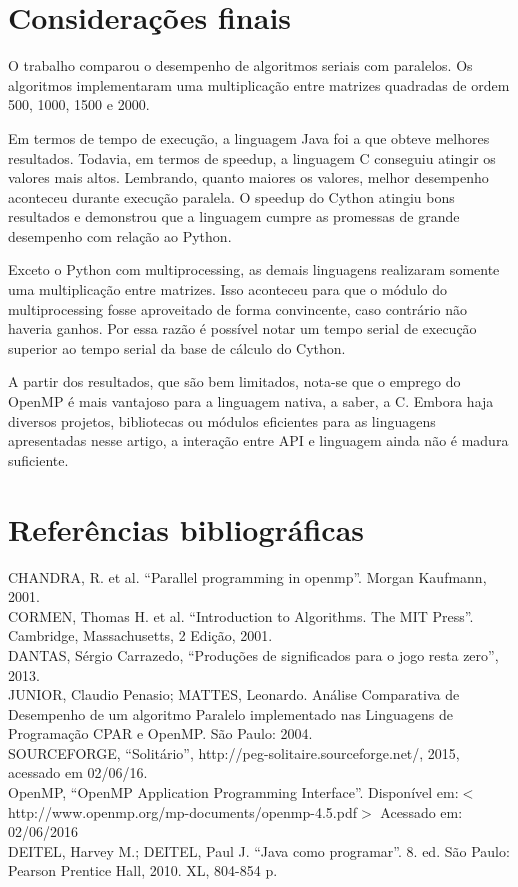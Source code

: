 \documentclass[a4paper,12pt]{article}
\begin{document}
\section{Considerações finais}
O trabalho comparou o desempenho de algoritmos seriais com paralelos. Os algoritmos implementaram uma multiplicação entre matrizes quadradas de ordem 500, 1000, 1500 e 2000. 

Em termos de tempo de execução, a linguagem Java foi a que obteve melhores resultados. Todavia, em termos de speedup, a linguagem C conseguiu atingir os valores mais altos. Lembrando, quanto maiores os valores, melhor desempenho aconteceu durante execução paralela. O speedup do Cython atingiu bons resultados e demonstrou que a linguagem cumpre as promessas de grande desempenho com relação ao Python. 

Exceto o Python com multiprocessing, as demais linguagens realizaram somente uma multiplicação entre matrizes. Isso aconteceu para que o módulo do multiprocessing fosse aproveitado de forma convincente, caso contrário não haveria ganhos. Por essa razão é possível notar um tempo serial de execução superior ao tempo serial da base de cálculo do Cython.

A partir dos resultados, que são bem limitados, nota-se que o emprego do OpenMP é mais vantajoso para a linguagem nativa, a saber, a C. Embora haja diversos projetos, bibliotecas ou módulos eficientes para as linguagens apresentadas nesse artigo, a interação entre API e linguagem ainda não é madura suficiente.  

\section{Referências bibliográficas}
\noindent
\cite{1} CHANDRA, R. et al. “Parallel programming in openmp”. Morgan Kaufmann, 2001.\\
\hspace{0.5cm}
\cite{2} CORMEN, Thomas H. et al. “Introduction to Algorithms. The MIT Press”. Cambridge, Massachusetts, 2 Edição, 2001.\\
\hspace{0.5cm}
\cite{3} DANTAS, Sérgio Carrazedo, “Produções de significados para o jogo resta zero”, 2013. \\
\hspace{0.5cm}
\cite{4} JUNIOR, Claudio Penasio; MATTES, Leonardo. Análise Comparativa de Desempenho de um algoritmo Paralelo
implementado nas Linguagens de Programação CPAR e OpenMP. São Paulo: 2004. \\
\hspace{0.5cm}
\cite{5} SOURCEFORGE, “Solitário”, http://peg-solitaire.sourceforge.net/, 2015, acessado em 02/06/16.\\
\hspace{0.5cm}
\cite{6} OpenMP, “OpenMP Application Programming Interface”. Disponível em:$<$http://www.openmp.org/mp-documents/openmp-4.5.pdf$>$ Acessado em: 02/06/2016\\
\hspace{0.5cm}
\cite{7} DEITEL, Harvey M.; DEITEL, Paul J. “Java como programar”. 8. ed. São Paulo: Pearson Prentice Hall, 2010. XL, 804-854 p.\\



\end{document}
